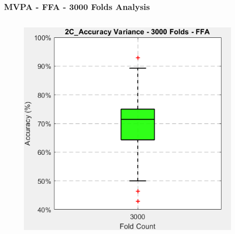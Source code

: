 \begin{frame}
\frametitle{MVPA - FFA - 3000 Folds Analysis}
	\begin{columns}
		\begin{column}{0.49\textwidth}		
			\begin{itemize}
			\end{itemize}
			\begin{figure}
				\centering
				\includegraphics[width=0.98\textwidth]{assets/box_2C_3000_ffa.png}
			\end{figure}
		\end{column}


\end{columns}
\end{frame}
